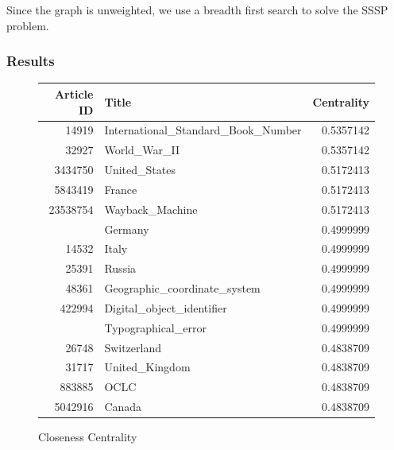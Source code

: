 \documentclass{article}
\begin{document}
Since the graph is unweighted, we use a breadth first search to solve the SSSP problem.

\subsubsection{Results}





\begin{figure}[H]
    \caption[fig]{Closeness Centrality}
    \centering
    \begin{tabular}{rlr}
        \toprule
        Article ID & Title & Centrality \\
        \midrule
        14919 & International\_Standard\_Book\_Number & 0.5357142\\
        32927 & World\_War\_II & 0.5357142\\
        3434750 & United\_States & 0.5172413\\
        5843419 & France & 0.5172413\\
        23538754 & Wayback\_Machine & 0.5172413\\
        \addlinespace
        11867 & Germany & 0.4999999\\
        14532 & Italy & 0.4999999\\
        25391 & Russia & 0.4999999\\
        48361 & Geographic\_coordinate\_system & 0.4999999\\
        422994 & Digital\_object\_identifier & 0.4999999\\
        \addlinespace
        1057428 & Typographical\_error & 0.4999999\\
        26748 & Switzerland & 0.4838709\\
        31717 & United\_Kingdom & 0.4838709\\
        883885 & OCLC & 0.4838709\\
        5042916 & Canada & 0.4838709\\
    \bottomrule
\end{tabular}
\end{figure}
\end{document}
